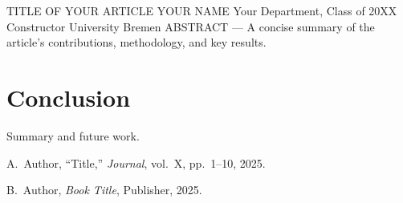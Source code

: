 %

\label{art:ARTICLE01}

\articleheader
  {TITLE OF YOUR ARTICLE}
  {YOUR NAME}
  {Your Department, Class of 20XX\\Constructor University Bremen}
  {ABSTRACT --- A concise summary of the article's contributions,
   methodology, and key results.}






\section{Conclusion}

Summary and future work.

\articlereferences

\begin{enumerate}[label={[\arabic*]}, leftmargin=2em, itemsep=0.25em]
  \item A.~Author, ``Title,'' \textit{Journal}, vol.~X, pp.~1--10, 2025.
  \item B.~Author, \textit{Book Title}, Publisher, 2025.
\end{enumerate}
